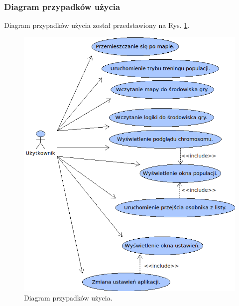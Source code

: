\subsubsection{Diagram przypadków użycia}
\begin{par}
	Diagram przypadków użycia został przedstawiony na Rys. \ref{fig:diagram_przypadkow}.
		\begin{figure}[!h]
		\centering
		\includegraphics[width=\textwidth]{obrazki/diagram_przypadkow.png}
		\caption{Diagram przypadków użycia.}
		\label{fig:diagram_przypadkow}
		\end{figure}
		\FloatBarrier
\end{par}
